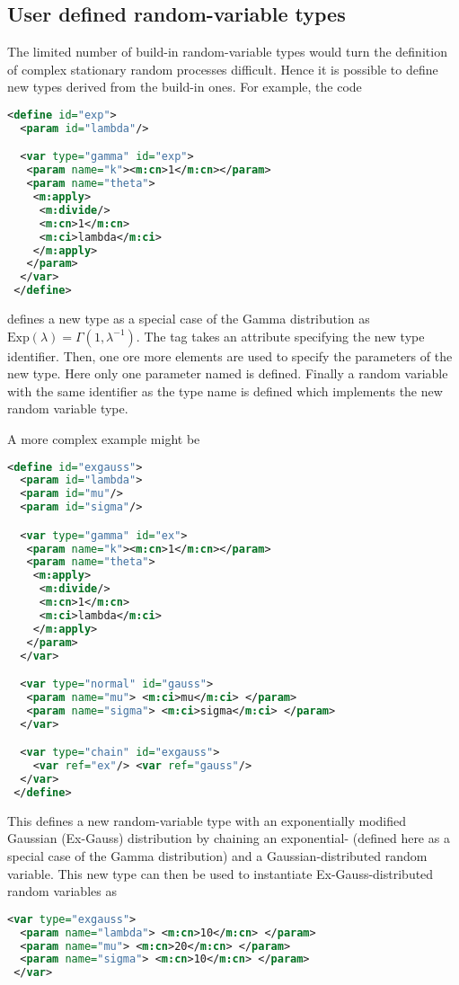 \subsection{User defined random-variable types}
The limited number of build-in random-variable types would turn the definition of complex stationary random
processes difficult. Hence it is possible to define new types derived from the build-in ones. For example,
the code 
\begin{lstlisting}[language=XML]
 <define id="exp">
  <param id="lambda"/>

  <var type="gamma" id="exp">
   <param name="k"><m:cn>1</m:cn></param>
   <param name="theta">
    <m:apply>
     <m:divide/>
     <m:cn>1</m:cn>
     <m:ci>lambda</m:ci>
    </m:apply>
   </param>
  </var>
 </define>
\end{lstlisting}
defines a new type  as a special case of the Gamma distribution as
$\text{Exp}(\lambda) = \Gamma(1,\lambda^{-1})$. The  tag takes an  
attribute specifying the new type identifier. Then, one ore more  elements are
used to specify the parameters of the new type. 
Here only one parameter named  is defined. Finally a random variable with the same
identifier as the type name is defined which implements the new random variable type.

A more complex example might be
\begin{lstlisting}[language=XML]
 <define id="exgauss">
  <param id="lambda">
  <param id="mu"/>
  <param id="sigma"/>

  <var type="gamma" id="ex">
   <param name="k"><m:cn>1</m:cn></param>
   <param name="theta">
    <m:apply>
     <m:divide/>
     <m:cn>1</m:cn>
     <m:ci>lambda</m:ci>
    </m:apply>
   </param>
  </var>

  <var type="normal" id="gauss">
   <param name="mu"> <m:ci>mu</m:ci> </param>
   <param name="sigma"> <m:ci>sigma</m:ci> </param>
  </var>

  <var type="chain" id="exgauss">
    <var ref="ex"/> <var ref="gauss"/>
  </var>
 </define>
\end{lstlisting}

This defines a new random-variable type with an exponentially modified Gaussian (Ex-Gauss) 
distribution by chaining an exponential- (defined here as a special case of the Gamma 
distribution) and a Gaussian-distributed random variable. This new type can then be used
to instantiate Ex-Gauss-distributed random variables as
\begin{lstlisting}[language=XML]
 <var type="exgauss">
  <param name="lambda"> <m:cn>10</m:cn> </param>
  <param name="mu"> <m:cn>20</m:cn> </param>
  <param name="sigma"> <m:cn>10</m:cn> </param>
 </var>
\end{lstlisting}

